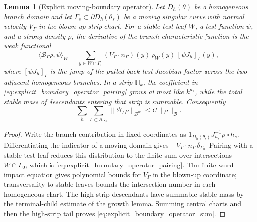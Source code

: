 \documentclass[12pt, letterpaper]{amsart}
\newcommand{\Bcal}{\mathcal{B}}
\theoremstyle{plain}
\newtheorem{lemma}[theorem]{Lemma}
\theoremstyle{definition}
\theoremstyle{remark}
\begin{document}
\begin{lemma}[Explicit moving-boundary operator]
\label{lem:explicit_moving_boundary_operator}
Let \(D_h(\theta)\) be a homogeneous branch domain and let
\(\Gamma_s\subset\partial D_h(\theta_s)\) be a moving singular curve with normal
velocity \(V_\Gamma\) in the blown-up strip chart.  For a stable test leaf
\(W\), a test function \(\psi\), and a strong density \(\rho\), the derivative
of the branch characteristic function is the weak functional
\begin{equation}
\label{eq:explicit_boundary_operator_pairing}
    \big\langle \mathcal B_\Gamma\rho,\psi\big\rangle_W
    =\sum_{y\in W\cap\Gamma_0}
      (V_\Gamma\cdot n_\Gamma)(y)\,
      \rho_W(y)\,
      [\psi J_h]_\Gamma(y),
\end{equation}
where \([\psi J_h]_\Gamma\) is the jump of the pulled-back test-Jacobian factor
across the two adjacent homogeneous branches.  In a strip \(\mathbb H_k\), the
coefficient in \eqref{eq:explicit_boundary_operator_pairing} grows at most like
\(k^{a_1}\), while the total stable mass of descendants entering that strip is
summable.  Consequently
\begin{equation}
\label{eq:explicit_boundary_operator_sum}
    \sum_{h}\sum_{\Gamma\subset\partial D_h}
    \|\mathcal B_\Gamma\rho\|_{\Bcal^w}\le C\|\rho\|_{\Bcal}.
\end{equation}
\end{lemma}

\begin{proof}
Write the branch contribution in fixed coordinates as
\(1_{D_h(\theta_s)}J_{h_s}^{-1}\rho\circ h_s\).  Differentiating the indicator
of a moving domain gives
\(-V_\Gamma\cdot n_\Gamma\,\delta_{\Gamma_0}\).  Pairing with a stable test leaf
reduces this distribution to the finite sum over intersections
\(W\cap\Gamma_0\), which is \eqref{eq:explicit_boundary_operator_pairing}.  The
finite-word impact equation gives polynomial bounds for \(V_\Gamma\) in the
blown-up coordinate; transversality to stable leaves bounds the intersection
number in each homogeneous chart.  The high-strip descendants have summable
stable mass by the terminal-child estimate of the growth lemma.  Summing central
charts and then the high-strip tail proves \eqref{eq:explicit_boundary_operator_sum}.
\end{proof}
\end{document}
